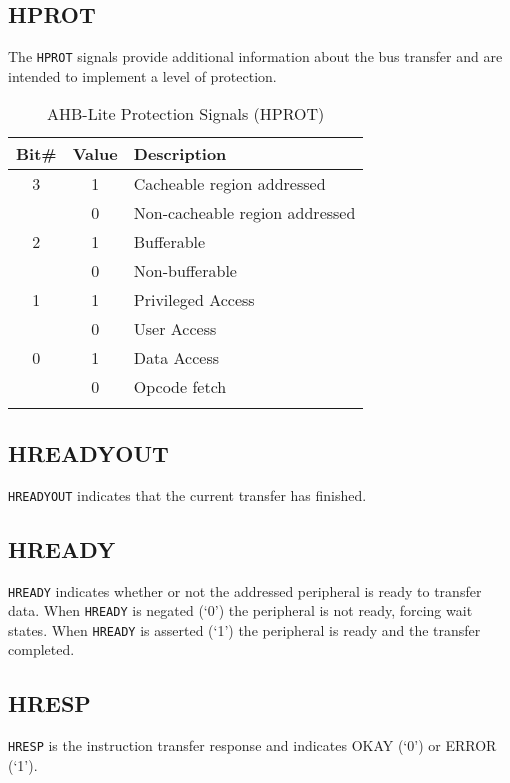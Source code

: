\subsection{HPROT}\label{hprot}

The \texttt{HPROT} signals provide additional information about the bus transfer
and are intended to implement a level of protection.

\begin{longtable}[]{@{}ccl@{}}
	\toprule
		Bit\# & Value & Description\tabularnewline
	\midrule
	\endhead
		3 & 1 & Cacheable region addressed\tabularnewline
		  & 0 & Non-cacheable region addressed\tabularnewline
		2 & 1 & Bufferable\tabularnewline
		  & 0 & Non-bufferable\tabularnewline
		1 & 1 & Privileged Access\tabularnewline
		  & 0 & User Access\tabularnewline
		0 & 1 & Data Access\tabularnewline
		  & 0 & Opcode fetch\tabularnewline
	\bottomrule
	\caption{AHB-Lite Protection Signals (HPROT)}
\end{longtable}

\subsection{HREADYOUT}\label{hreadyout}

\texttt{HREADYOUT} indicates that the current transfer has finished.

\subsection{HREADY}\label{hready}

\texttt{HREADY} indicates whether or not the addressed peripheral is ready to
transfer data. When \texttt{HREADY} is negated (`0') the peripheral is not ready,
forcing wait states. When \texttt{HREADY} is asserted (`1') the peripheral is
ready and the transfer completed.

\subsection{HRESP}\label{hresp}

\texttt{HRESP} is the instruction transfer response and indicates OKAY (`0') or ERROR (`1').
